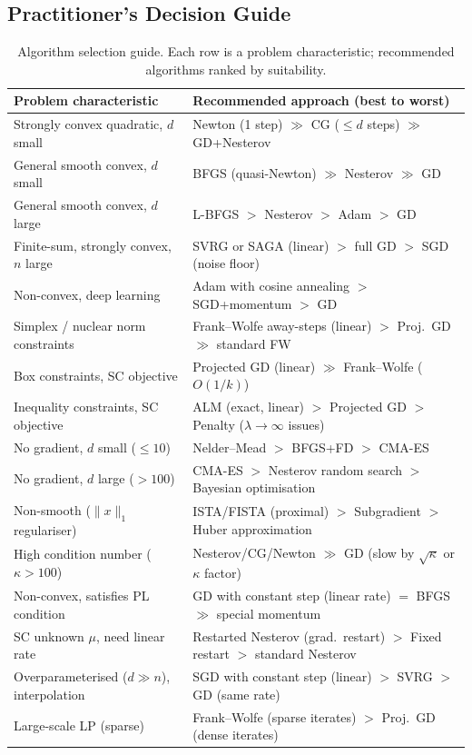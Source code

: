 \documentclass[11pt,a4paper]{article}
\theoremstyle{definition}
\begin{document}
\subsection{Practitioner's Decision Guide}

\begin{table}[H]
\centering
\caption{Algorithm selection guide. Each row is a problem characteristic; recommended algorithms ranked by suitability.}
\label{tab:practitioner}
\begin{tabular}{p{4.5cm}p{9.5cm}}
\toprule
\textbf{Problem characteristic} & \textbf{Recommended approach (best to worst)} \\
\midrule
Strongly convex quadratic, $d$ small & Newton (1 step) $\gg$ CG ($\leq d$ steps) $\gg$ GD+Nesterov \\
General smooth convex, $d$ small & BFGS (quasi-Newton) $\gg$ Nesterov $\gg$ GD \\
General smooth convex, $d$ large & L-BFGS $>$ Nesterov $>$ Adam $>$ GD \\
Finite-sum, strongly convex, $n$ large & SVRG or SAGA (linear) $>$ full GD $>$ SGD (noise floor) \\
Non-convex, deep learning & Adam with cosine annealing $>$ SGD+momentum $>$ GD \\
Simplex / nuclear norm constraints & Frank--Wolfe away-steps (linear) $>$ Proj.\ GD $\gg$ standard FW \\
Box constraints, SC objective & Projected GD (linear) $\gg$ Frank--Wolfe ($O(1/k)$) \\
Inequality constraints, SC objective & ALM (exact, linear) $>$ Projected GD $>$ Penalty ($\lambda\to\infty$ issues) \\
No gradient, $d$ small ($\leq 10$) & Nelder--Mead $>$ BFGS+FD $>$ CMA-ES \\
No gradient, $d$ large ($> 100$) & CMA-ES $>$ Nesterov random search $>$ Bayesian optimisation \\
Non-smooth ($\|x\|_1$ regulariser) & ISTA/FISTA (proximal) $>$ Subgradient $>$ Huber approximation \\
High condition number ($\kappa > 100$) & Nesterov/CG/Newton $\gg$ GD (slow by $\sqrt{\kappa}$ or $\kappa$ factor) \\
Non-convex, satisfies PL condition & GD with constant step (linear rate) $=$ BFGS $\gg$ special momentum \\
SC unknown $\mu$, need linear rate & Restarted Nesterov (grad.\ restart) $>$ Fixed restart $>$ standard Nesterov \\
Overparameterised ($d \gg n$), interpolation & SGD with constant step (linear) $>$ SVRG $>$ GD (same rate) \\
Large-scale LP (sparse) & Frank--Wolfe (sparse iterates) $>$ Proj.\ GD (dense iterates) \\
\bottomrule
\end{tabular}
\end{table}
\end{document}

